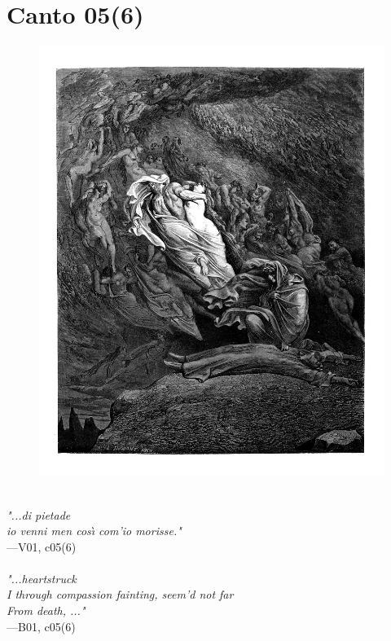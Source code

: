 \documentclass[../Dore_vision.tex]{subfiles}
\begin{document}
\section{Canto 05(6)}

\begin{figure}[ht]
\centering
\includegraphics[height=\figsize]{illustrations/book_1/V01, c05(6).jpg}
\end{figure}

\begin{center}
\begin{minipage}{0.8\linewidth}
\textit{\\
"...di pietade\\io venni men cos\`{\i} com’io morisse."} \\
—V01, c05(6) \\~\\
\textit{"...heartstruck\\I through compassion fainting, seem'd not far\\From death, ..."} \\
—B01, c05(6)
\end{minipage}
\end{center}
\end{document}
